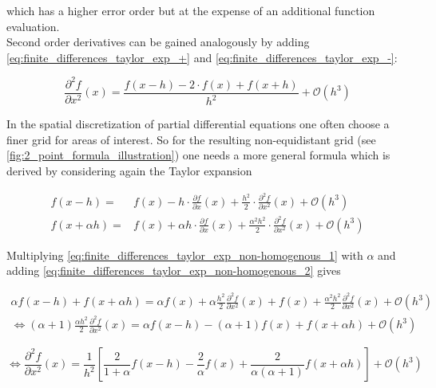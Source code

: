 \documentclass{scrartcl}[12pt, halfparskip]
\numberwithin{equation}{section}
\numberwithin{figure}{section}
\numberwithin{table}{section}
\begin{document}
which has a higher error order but at the expense of an additional function evaluation. \\

Second order derivatives can be gained analogously by adding \cref{eq:finite_differences_taylor_exp_+} and \cref{eq:finite_differences_taylor_exp_-}:

\begin{equation}
\frac{\partial^2 f}{\partial x^2}(x) = \frac{f(x-h) - 2 \cdot f(x) + f(x+h)}{h^2} + \mathcal{O}(h^3)
\label{eq:finite_difference_2nd_der}
\end{equation}

In the spatial discretization of partial differential equations one often choose a finer grid for areas of interest. So for the resulting non-equidistant grid (see \cref{fig:2_point_formula_illustration}) one needs a more general formula which is derived by considering again the Taylor expansion

\begin{subequations}
	\label{eq:finite_differences_taylor_exp_non-homogenous}
	\begin{align}
	f(x-h) = & f(x) - h \cdot \frac{\partial f}{\partial x}(x) + \frac{h^2}{2} \cdot \frac{\partial^2 f}{\partial x^2}(x) + \mathcal{O}(h^3) \label{eq:finite_differences_taylor_exp_non-homogenous_1} \\
	f(x+\alpha h) = & f(x) + \alpha h \cdot \frac{\partial f}{\partial x}(x) + \frac{\alpha^2 h^2}{2} \cdot \frac{\partial^2 f}{\partial x^2}(x) + \mathcal{O}(h^3)  \label{eq:finite_differences_taylor_exp_non-homogenous_2}
	\end{align}
\end{subequations}



Multiplying \cref{eq:finite_differences_taylor_exp_non-homogenous_1} with $\alpha$ and adding \cref{eq:finite_differences_taylor_exp_non-homogenous_2} gives

\begin{align}
\alpha f(x-h) + f(x+\alpha h) = \alpha f(x) + \alpha \frac{h^2}{2} \frac{\partial^2 f}{\partial x^2}(x) + f(x) + \frac{\alpha^2 h^2}{2} \frac{\partial^2 f}{\partial x^2}(x) + \mathcal{O}(h^3)  \\
\Leftrightarrow (\alpha+1) \frac{\alpha h^2}{2} \frac{\partial^2 f}{\partial x^2}(x) = \alpha f(x-h) - (\alpha+1) f(x) + f(x+\alpha h) + \mathcal{O}(h^3) 
\end{align}

\begin{equation}
\Leftrightarrow \frac{\partial^2 f}{\partial x^2}(x) = \frac{1}{h^2} \left[ \frac{2}{1+\alpha} f(x-h) - \frac{2}{\alpha} f(x) + \frac{2}{\alpha (\alpha+1)} f(x+\alpha h) \right] + \mathcal{O}(h^3) 
\label{eq:2_point_formula_inhomogeneous}
\end{equation} \\
\end{document}
